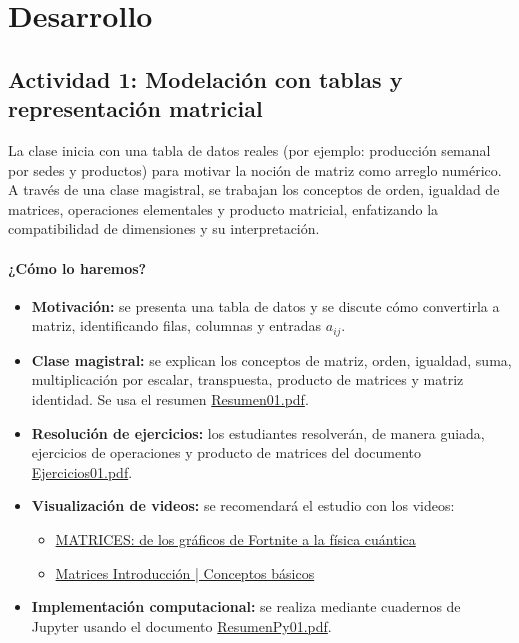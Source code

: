 \documentclass[a4,11pt]{aleph-notas}
\begin{document}
\section*{Desarrollo}  

\subsection*{Actividad 1: Modelación con tablas y representación matricial}

La clase inicia con una tabla de datos reales (por ejemplo: producción semanal por sedes y productos) para motivar la noción de matriz como arreglo numérico. A través de una clase magistral, se trabajan los conceptos de orden, igualdad de matrices, operaciones elementales y producto matricial, enfatizando la compatibilidad de dimensiones y su interpretación.

\paragraph{¿Cómo lo haremos?}  
\begin{itemize}[leftmargin=*]  
    \item \textbf{Motivación:} se presenta una tabla de datos y se discute cómo convertirla a matriz, identificando filas, columnas y entradas $a_{ij}$.
    \item \textbf{Clase magistral:} se explican los conceptos de matriz, orden, igualdad, suma, multiplicación por escalar, transpuesta, producto de matrices y matriz identidad. Se usa el resumen \href{https://fcena-puce.github.io/AlgebraLineal-05-N0048/01Resumen/Resumen01.pdf}{Resumen01.pdf}.  
    \item \textbf{Resolución de ejercicios:} los estudiantes resolverán, de manera guiada, ejercicios de operaciones y producto de matrices del documento \href{https://fcena-puce.github.io/AlgebraLineal-05-N0048/04Ejercicios/Ejercicios01.pdf}{Ejercicios01.pdf}.  
    \item \textbf{Visualización de videos:} se recomendará el estudio con los videos:  
    \begin{itemize}
        \item \href{https://youtu.be/9FKFgNQktkU?si=kGRbP9Ad-NRRciwL}{MATRICES: de los gráficos de Fortnite a la física cuántica}
        \item \href{https://youtu.be/m6w5vLA3Lnw?si=xcCeg-0snioQb-ns}{Matrices Introducción | Conceptos básicos}
    \end{itemize}  
    \item \textbf{Implementación computacional:} se realiza mediante cuadernos de Jupyter usando el documento \href{https://fcena-puce.github.io/AlgebraLineal-05-N0048/02ResumenPython/ResumenPy01.pdf}{ResumenPy01.pdf}.
\end{itemize}  
\end{document}

